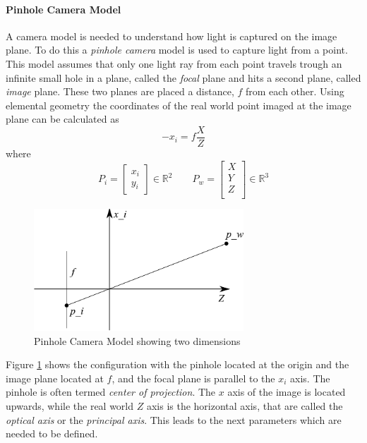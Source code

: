 \paragraph{Pinhole Camera Model}
A camera model is needed to understand how light is captured on the image plane. To do
this a \emph{pinhole camera} model is used to capture light from a point. This model
assumes that only one light ray from each point travels trough an infinite small hole in
a plane, called the \emph{focal} plane and hits a second plane, called \emph{image} plane.
These two planes are placed a distance, $f$ from each other. Using elemental geometry the
coordinates of the real world point imaged at the image plane can be calculated as
\begin{equation}
    -x_i = f \frac{X}{Z}
\end{equation}
where
\begin{equation}
    P_i = \left [ \begin{array}{c}
        x_i \\
        y_i 
    \end{array} \right]  \in \mathbb{R}^2 \quad \quad P_w = \left [
    \begin{array}{c}
        X \\
        Y \\
        Z \\ 
    \end{array} \right] \in \mathbb{R}^3 
\end{equation}
\begin{figure}[hbtp]
    \centering
    \includegraphics[width=0.7\textwidth]{pics/pinhole_model}
    \caption{Pinhole Camera Model showing two dimensions}
    \label{chap2:fig-pinholemodel}
\end{figure}

Figure \ref{chap2:fig-pinholemodel} shows the configuration with the pinhole located at
the origin and the image plane located at $f$, and the focal plane is parallel to the $x_i$
axis. The pinhole is often termed \emph{center of projection}. The $x$ axis of the image is located
upwards, while the real world $Z$ axis is the horizontal axis, that are called the
\emph{optical axis} or the \emph{principal axis}. This leads to the next parameters which
are needed to be defined.

